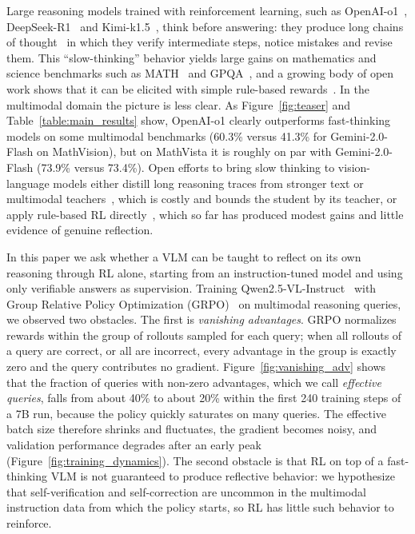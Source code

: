 \documentclass{article}
\begin{document}
Large reasoning models trained with reinforcement learning, such as OpenAI-o1~\cite{openai-o1}, DeepSeek-R1~\cite{deepseek-r1} and Kimi-k1.5~\cite{kimi-1_5}, think before answering: they produce long chains of thought~\cite{wei2022chain} in which they verify intermediate steps, notice mistakes and revise them. This ``slow-thinking'' behavior yields large gains on mathematics and science benchmarks such as MATH~\cite{math} and GPQA~\cite{gpqa}, and a growing body of open work shows that it can be elicited with simple rule-based rewards~\cite{simplerl,open-reasoner-zero,deepscaler2025,dapo,drgrpo}. In the multimodal domain the picture is less clear. As Figure~\ref{fig:teaser} and Table~\ref{table:main_results} show, OpenAI-o1 clearly outperforms fast-thinking models on some multimodal benchmarks (60.3\% versus 41.3\% for Gemini-2.0-Flash on MathVision), but on MathVista it is roughly on par with Gemini-2.0-Flash (73.9\% versus 73.4\%). Open efforts to bring slow thinking to vision-language models either distill long reasoning traces from stronger text or multimodal teachers~\cite{virgo,insight_v,llavacot,Mulberry,R1OneVision,OpenVLThinker,vision-r1}, which is costly and bounds the student by its teacher, or apply rule-based RL directly~\cite{mmeureka,lmm-r1,r1vl}, which so far has produced modest gains and little evidence of genuine reflection.





In this paper we ask whether a VLM can be taught to reflect on its own reasoning through RL alone, starting from an instruction-tuned model and using only verifiable answers as supervision. Training Qwen2.5-VL-Instruct~\cite{qwen2_5_vl} with Group Relative Policy Optimization (GRPO)~\cite{deepseek-r1} on multimodal reasoning queries, we observed two obstacles. The first is \emph{vanishing advantages}. GRPO normalizes rewards within the group of rollouts sampled for each query; when all rollouts of a query are correct, or all are incorrect, every advantage in the group is exactly zero and the query contributes no gradient. Figure~\ref{fig:vanishing_adv} shows that the fraction of queries with non-zero advantages, which we call \emph{effective queries}, falls from about 40\% to about 20\% within the first 240 training steps of a 7B run, because the policy quickly saturates on many queries. The effective batch size therefore shrinks and fluctuates, the gradient becomes noisy, and validation performance degrades after an early peak (Figure~\ref{fig:training_dynamics}). The second obstacle is that RL on top of a fast-thinking VLM is not guaranteed to produce reflective behavior: we hypothesize that self-verification and self-correction are uncommon in the multimodal instruction data from which the policy starts, so RL has little such behavior to reinforce.
\end{document}
